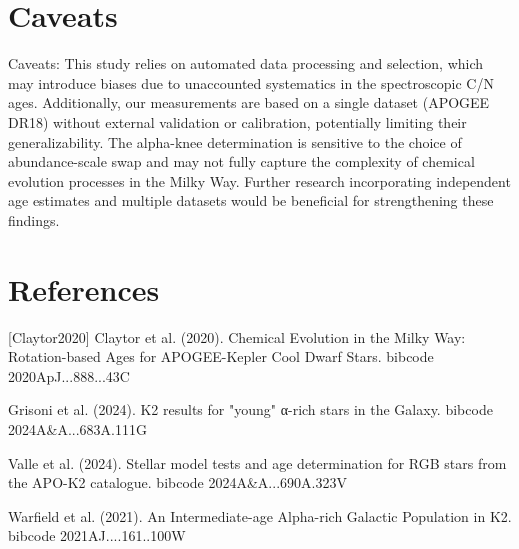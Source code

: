\documentclass[twocolumn]{aastex631}
\begin{document}
\section{Caveats}
Caveats:
This study relies on automated data processing and selection, which may introduce biases due to unaccounted systematics in the spectroscopic C/N ages. Additionally, our measurements are based on a single dataset (APOGEE DR18) without external validation or calibration, potentially limiting their generalizability. The alpha-knee determination is sensitive to the choice of abundance-scale swap and may not fully capture the complexity of chemical evolution processes in the Milky Way. Further research incorporating independent age estimates and multiple datasets would be beneficial for strengthening these findings.
\section*{References}
\footnotesize
[Claytor2020] Claytor et al. (2020). Chemical Evolution in the Milky Way: Rotation-based Ages for APOGEE-Kepler Cool Dwarf Stars. bibcode 2020ApJ...888...43C \par [Grisoni2024] Grisoni et al. (2024). K2 results for "young" α-rich stars in the Galaxy. bibcode 2024A\&A...683A.111G \par [Valle2024] Valle et al. (2024). Stellar model tests and age determination for RGB stars from the APO-K2 catalogue. bibcode 2024A\&A...690A.323V \par [Warfield2021] Warfield et al. (2021). An Intermediate-age Alpha-rich Galactic Population in K2. bibcode 2021AJ....161..100W
\end{document}
